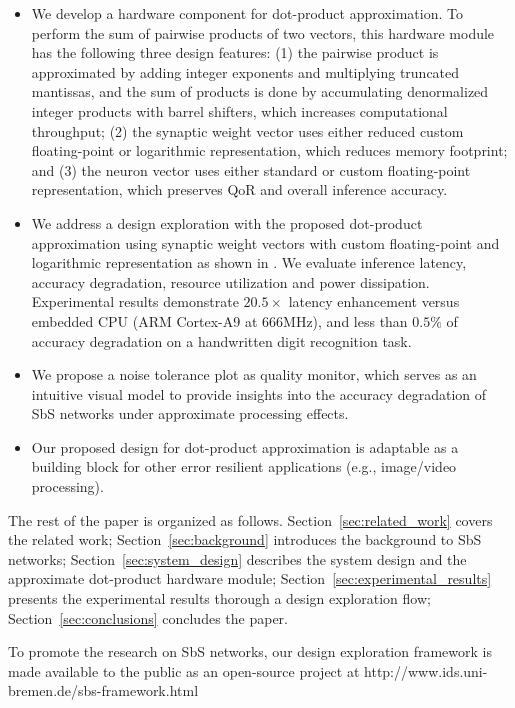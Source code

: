 \begin{itemize}
	\item We develop a hardware component for dot-product approximation. To perform the sum of pairwise products of two vectors, this hardware module has the following three design features: (1) the pairwise product is approximated by adding integer exponents and multiplying truncated mantissas, and the sum of products is done by accumulating denormalized integer products with barrel shifters, which increases computational throughput; (2) the synaptic weight vector uses either reduced custom floating-point or logarithmic representation, which reduces memory footprint; and (3) the neuron vector uses either standard or custom floating-point representation, which preserves QoR and overall inference accuracy.
	\item We address a design exploration with the proposed dot-product approximation using synaptic weight vectors with custom floating-point and logarithmic representation as shown in . We evaluate inference latency, accuracy degradation, resource utilization and power dissipation. Experimental results demonstrate $20.5\times$ latency enhancement versus embedded CPU (ARM Cortex-A9 at 666MHz), and less than $0.5\%$ of accuracy degradation on a handwritten digit recognition task.
	\item We propose a noise tolerance plot as quality monitor, which serves as an intuitive visual model to provide insights into the accuracy degradation of SbS networks under approximate processing effects.
	\item Our proposed design for dot-product approximation is adaptable as a building block for other error resilient applications (e.g., image/video processing).
\end{itemize}


The rest of the paper is organized as follows. Section~\ref{sec:related_work} covers the related work; Section~\ref{sec:background} introduces the background to SbS networks; Section~\ref{sec:system_design} describes the system design and the approximate dot-product hardware module; Section~\ref{sec:experimental_results} presents the experimental results thorough a design exploration flow; Section~\ref{sec:conclusions} concludes the paper.


To promote the research on SbS networks, our design exploration framework is made available to the public as an open-source project at http://www.ids.uni-bremen.de/sbs-framework.html

